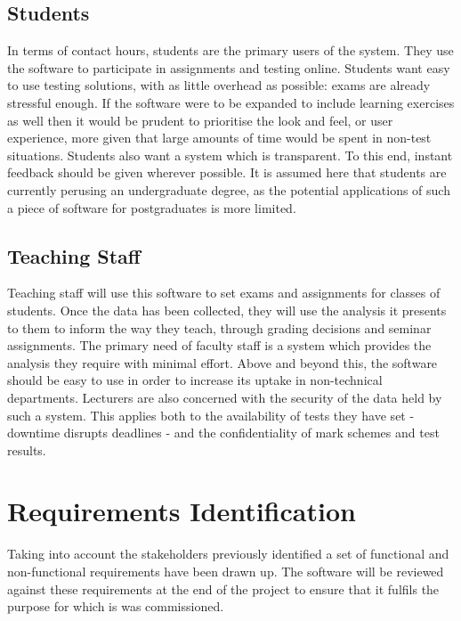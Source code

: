 \documentclass[12pt,a4paper,twoside]{report}
\begin{document}
\subsection{Students}
In terms of contact hours, students are the primary users of the system. They use the software to participate in assignments and testing online. Students want easy to use testing solutions, with as little overhead as possible: exams are already stressful enough. If the software were to be expanded to include learning exercises as well then it would be prudent to prioritise the look and feel, or user experience, more given that large amounts of time would be spent in non-test situations. Students also want a system which is transparent. To this end, instant feedback should be given wherever possible. It is assumed here that students are currently perusing an undergraduate degree, as the potential applications of such a piece of software for postgraduates is more limited.

\subsection{Teaching Staff}
Teaching staff will use this software to set exams and assignments for classes of students. Once the data has been collected, they will use the analysis it presents to them to inform the way they teach, through grading decisions and seminar assignments. The primary need of faculty staff is a system which provides the analysis they require with minimal effort. Above and beyond this, the software should be easy to use in order to increase its uptake in non-technical departments. Lecturers are also concerned with the security of the data held by such a system. This applies both to the availability of tests they have set - downtime disrupts deadlines - and the confidentiality of mark schemes and test results.

\section{Requirements Identification}
Taking into account the stakeholders previously identified a set of functional and non-functional requirements have been drawn up. The software will be reviewed against these requirements at the end of the project to ensure that it fulfils the purpose for which is was commissioned.
\end{document}
